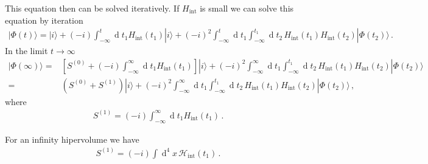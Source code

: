 \begin{frame}
This equation then can  be solved iteratively. If $H_{\text{int}}$ is small we can solve this equation by iteration
\begin{align}
\label{eq:95f}
  |\Phi(t)\rangle=|i\rangle+(-i)\int_{-\infty}^t \operatorname{d}t_1 H_{\text{int}}(t_1)|i\rangle+(-i)^2\int_{-\infty}^t \operatorname{d}t_1\int_{-\infty}^{t_1} \operatorname{d}t_2\,H_{\text{int}}(t_1)H_{\text{int}}(t_2)|\Phi(t_2)\rangle\,.
\end{align}
In the limit $t\to\infty$
\begin{align}
  |\Phi(\infty)\rangle=&\left[S^{(0)}+(-i)\int_{-\infty}^\infty \operatorname{d}t_1 H_{\text{int}}(t_1)\right]|i\rangle+(-i)^2\int_{-\infty}^\infty \operatorname{d}t_1\int_{-\infty}^{t_1} \operatorname{d}t_2\,H_{\text{int}}(t_1)H_{\text{int}}(t_2)|\Phi(t_2)\rangle\nonumber\\
  =&\left(S^{(0)}+S^{(1)}\right)|i\rangle+(-i)^2\int_{-\infty}^\infty \operatorname{d}t_1\int_{-\infty}^{t_1} \operatorname{d}t_2\,H_{\text{int}}(t_1)H_{\text{int}}(t_2)|\Phi(t_2)\rangle\,,
\end{align}
where 
\begin{align}
  \label{eq:S1}
  S^{(1)}=(-i)\int_{-\infty}^\infty \operatorname{d}t_1 H_{\text{int}}(t_1)\,.
\end{align}

For an infinity hipervolume we have
\begin{align}
  \label{eq:S1d4xc}
  S^{(1)}=(-i)\int \operatorname{d}^4x\, \mathcal{H}_{\text{int}}(t_1)\,.
\end{align}
\end{frame}

